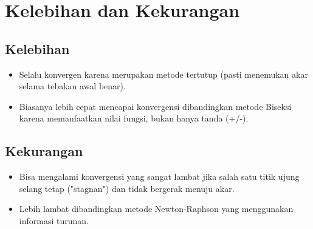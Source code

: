 \documentclass[12pt,a4paper]{article}
\begin{document}
\section{Kelebihan dan Kekurangan}
\subsection{Kelebihan}
\begin{itemize}
	\item Selalu konvergen karena merupakan metode tertutup (pasti menemukan akar selama tebakan awal benar).
  \item Biasanya lebih cepat mencapai konvergensi dibandingkan metode Biseksi karena memanfaatkan nilai fungsi, bukan hanya tanda (+/-).
\end{itemize}

\subsection{Kekurangan}
\begin{itemize}
  \item Bisa mengalami konvergensi yang sangat lambat jika salah satu titik ujung selang tetap ("stagnan") dan tidak bergerak menuju akar.
  \item Lebih lambat dibandingkan metode Newton-Raphson yang menggunakan informasi turunan.
\end{itemize}
\end{document}
